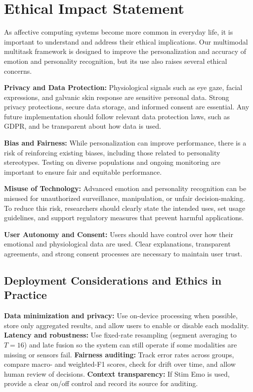 \documentclass[sigconf]{acmart}
\begin{document}
\section{Ethical Impact Statement}

As affective computing systems become more common in everyday life, it is important to understand and address their ethical implications. Our multimodal multitask framework is designed to improve the personalization and accuracy of emotion and personality recognition, but its use also raises several ethical concerns.

\textbf{Privacy and Data Protection:} Physiological signals such as eye gaze, facial expressions, and galvanic skin response are sensitive personal data. Strong privacy protections, secure data storage, and informed consent are essential. Any future implementation should follow relevant data protection laws, such as GDPR, and be transparent about how data is used.

\textbf{Bias and Fairness:} While personalization can improve performance, there is a risk of reinforcing existing biases, including those related to personality stereotypes. Testing on diverse populations and ongoing monitoring are important to ensure fair and equitable performance.

\textbf{Misuse of Technology:} Advanced emotion and personality recognition can be misused for unauthorized surveillance, manipulation, or unfair decision-making. To reduce this risk, researchers should clearly state the intended uses, set usage guidelines, and support regulatory measures that prevent harmful applications.

\textbf{User Autonomy and Consent:} Users should have control over how their emotional and physiological data are used. Clear explanations, transparent agreements, and strong consent processes are necessary to maintain user trust.

\subsection{Deployment Considerations and Ethics in Practice}
\textbf{Data minimization and privacy:} Use on-device processing when possible, store only aggregated results, and allow users to enable or disable each modality.  
\textbf{Latency and robustness:} Use fixed-rate resampling (segment averaging to $T{=}16$) and late fusion so the system can still operate if some modalities are missing or sensors fail.  
\textbf{Fairness auditing:} Track error rates across groups, compare macro- and weighted-F1 scores, check for drift over time, and allow human review of decisions.  
\textbf{Context transparency:} If Stim Emo is used, provide a clear on/off control and record its source for auditing.
\end{document}
